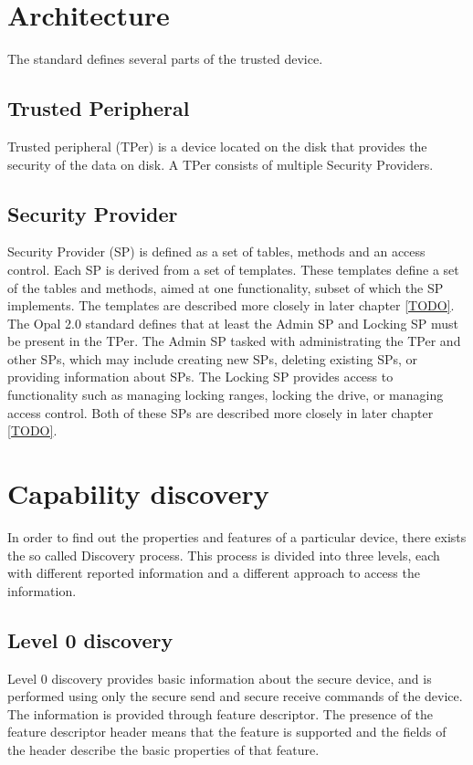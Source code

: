 \section{Architecture}

The standard defines several parts of the trusted device.

\subsection{Trusted Peripheral}

Trusted peripheral (TPer) is a device located on the disk that provides the security of the data on disk. A TPer consists of multiple Security Providers.

\subsection{Security Provider}

Security Provider (SP) is defined as a set of tables, methods and an access control. Each SP is derived from a set of templates. These templates define a set of the tables and methods, aimed at one functionality, subset of which the SP implements. The templates are described more closely in later chapter \ref{TODO}.
The Opal 2.0 standard defines that at least the Admin SP and Locking SP must be present in the TPer. The Admin SP tasked with administrating the TPer and other SPs, which may include creating new SPs, deleting existing SPs, or providing information about SPs. The Locking SP provides access to functionality such as managing locking ranges, locking the drive, or managing access control. Both of these SPs are described more closely in later chapter \ref{TODO}.

\section{Capability discovery}

In order to find out the properties and features of a particular device, there exists the so called Discovery process. This process is divided into three levels, each with different reported information and a different approach to access the information.

\subsection{Level 0 discovery}

Level 0 discovery provides basic information about the secure device, and is performed using only the secure send and secure receive commands of the device. The information is provided through feature descriptor. The presence of the feature descriptor header means that the feature is supported and the fields of the header describe the basic properties of that feature.

